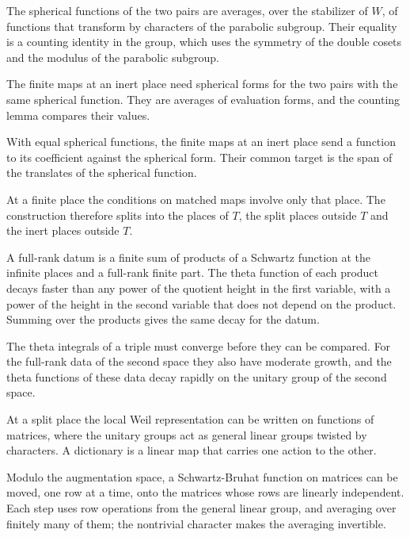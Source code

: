 The spherical functions of the two pairs are averages, over the stabilizer of
$W$, of functions that transform by characters of the parabolic subgroup. Their
equality is a counting identity in the group, which uses the symmetry of the
double cosets and the modulus of the parabolic subgroup.

The finite maps at an inert place need spherical forms for the two pairs with
the same spherical function. They are averages of evaluation forms, and the
counting lemma compares their values.

With equal spherical functions, the finite maps at an inert place send a function
to its coefficient against the spherical form. Their common target is the span
of the translates of the spherical function.

At a finite place the conditions on matched maps involve only that place.
The construction therefore splits into the places of $T$, the split places
outside $T$ and the inert places outside $T$.

A full-rank datum is a finite sum of products of a Schwartz function at the
infinite places and a full-rank finite part. The theta function of each product
decays faster than any power of the quotient height in the first variable,
with a power of the height in the second variable that does not depend on the
product. Summing over the products gives the same decay for the datum.

The theta integrals of a triple must converge before they can be compared.
For the full-rank data of the second space they also have moderate growth,
and the theta functions of these data decay rapidly on the unitary group of
the second space.

At a split place the local Weil representation can be written on functions of
matrices, where the unitary groups act as general linear groups twisted by
characters. A dictionary is a linear map that carries one action to the
other.

Modulo the augmentation space, a Schwartz-Bruhat function on matrices can be
moved, one row at a time, onto the matrices whose rows are linearly independent.
Each step uses row operations from the general linear group, and averaging over
finitely many of them; the nontrivial character makes the averaging invertible.

